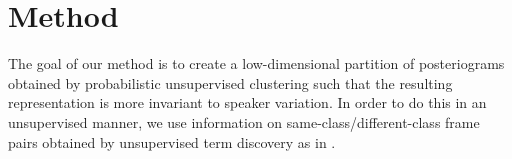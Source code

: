\section{Method}
\label{sec:method}

The goal of our method is to create a low-dimensional partition of posteriograms obtained by probabilistic unsupervised clustering such that the resulting representation is more invariant to speaker variation.
In order to do this in an unsupervised manner, we use information on same-class/different-class frame pairs obtained by unsupervised term discovery as in \parencite{jansen2011efficient}.




